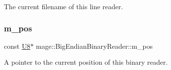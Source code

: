 The current filename of this line reader. \hypertarget{classmage_1_1_big_endian_binary_reader_a7dbfc5ce1712e431f75d80a4f7a56e33}{}\label{classmage_1_1_big_endian_binary_reader_a7dbfc5ce1712e431f75d80a4f7a56e33} 
\subsubsection{\texorpdfstring{m\+\_\+pos}{m\_pos}}
{\footnotesize\ttfamily const \hyperlink{namespacemage_afc638980bc6154f15af5e2d93a0e0ea9}{U8}$\ast$ mage\+::\+Big\+Endian\+Binary\+Reader\+::m\+\_\+pos\hspace{0.3cm}{\ttfamily [private]}}

A pointer to the current position of this binary reader. 